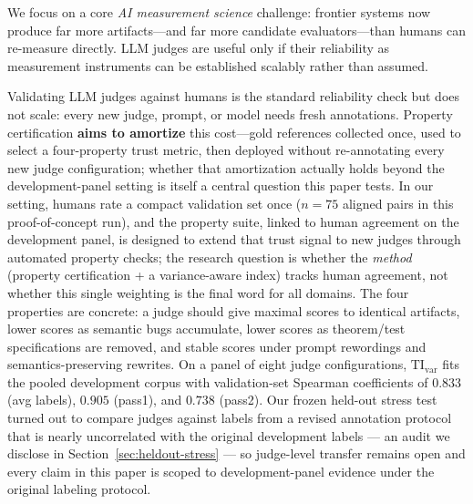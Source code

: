 \documentclass{article}
\begin{document}
We focus on a core \emph{AI measurement science} challenge: frontier systems now produce far more artifacts---and far more candidate evaluators---than humans can re-measure directly. LLM judges are useful only if their reliability as measurement instruments can be established scalably rather than assumed.

Validating LLM judges against humans is the standard reliability check but does not scale: every new judge, prompt, or model needs fresh annotations.
Property certification \textbf{aims to amortize} this cost---gold references collected once, used to select a four-property trust metric, then deployed without re-annotating every new judge configuration; whether that amortization actually holds beyond the development-panel setting is itself a central question this paper tests.
In our setting, humans rate a compact validation set once (\(n {=} 75\) aligned pairs in this proof-of-concept run), and the property suite, linked to human agreement on the development panel, is designed to extend that trust signal to new judges through automated property checks; the research question is whether the \emph{method} (property certification + a variance-aware index) tracks human agreement, not whether this single weighting is the final word for all domains.
The four properties are concrete: a judge should give maximal scores to identical artifacts, lower scores as semantic bugs accumulate, lower scores as theorem/test specifications are removed, and stable scores under prompt rewordings and semantics-preserving rewrites.
On a panel of eight judge configurations, \(\mathrm{TI}_{\mathrm{var}}\) fits the pooled development corpus with validation-set Spearman coefficients of \(0.833\) (avg labels), \(0.905\) (pass1), and \(0.738\) (pass2).
Our frozen held-out stress test turned out to compare judges against labels from a revised annotation protocol that is nearly uncorrelated with the original development labels --- an audit we disclose in Section~\ref{sec:heldout-stress} --- so judge-level transfer remains open and every claim in this paper is scoped to development-panel evidence under the original labeling protocol.
\end{document}

